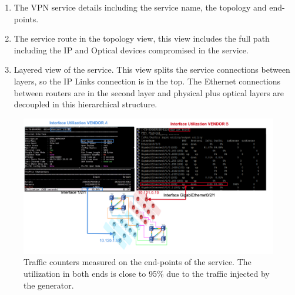 \documentclass[10pt, conference]{IEEEtran}
\begin{document}

\begin{enumerate}
    \item The VPN service details including the service name, the topology and end-points. 
    \item The service route in the topology view, this view includes the full path including the IP and Optical devices compromised in the service.
    \item Layered view of the service. This view splits the service connections between layers, so the IP Links connection is in the top. The Ethernet connections between routers are in the second layer and physical plus optical layers are decoupled in this hierarchical structure.
\end{enumerate}

\begin{figure}
	\centering
		\includegraphics[width=\linewidth]{figs/counters1.png}
	\caption{Traffic counters measured on the end-points of the service. The utilization in both ends is close to 95\% due to the traffic injected by the generator.}
	\label{FIG:counters}
\end{figure}
\end{document}
